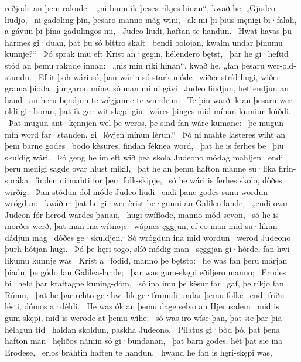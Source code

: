 reðjode an þem rakude: \hld\ „ni bium ik þeses ríkjes hinan“, kwað he,
„Gjudeo liudjo, \hld\ ni gadoling þín,
þesaro manno mág-wini, \hld\ ak mi þi þius męnigi bi·falah,
a-gávun þi þína gadulingos mi, \hld\ Judeo liudi,
haftan te handun. \hld\ Hwat havas þu harmes gi·duan,
þat þu só bittro skalt \hld\ bendi þolojan,
kwalm undar þínumu kunnje?“ \hld\ Þó sprak imu eft Krist an·gegin,
hélendero bętst, \hld\ þar he gi·heftid stód
an þemu rakude innan: \hld\ „nis mín ríki hinan“, kwað he,
„fan þesaru wer-old-stundu. \hld\ Ef it þoh wári só,
þan wárin só stark-móde \hld\ wiðer stríd-hugi,
wiðer grama þioda \hld\ jungaron míne,
só man mi ni gávi \hld\ Judeo liudjun,
hettendjun an hand \hld\ an heru-bęndjun
te wégjanne te wundrun. \hld\ Te þiu warð ik an þesaru wer-oldi gi·boran,
þat ik ge·wit-skępi giu \hld\ wáres þinges
mid mínun kumiun kúðdi. \hld\ Þat mugun ant·kęnnjen wel
þe weros, þe sind fan wáre kumane: \hld\ þe mugun mín word far·standen,
gi·lòvjen mínun lèrun.“ \hld\ Þó ni mahte lasteres wiht
an þem barne godes \hld\ bodo kèsures,
findan féknea word, \hld\ þat he is ferhes be·þiu
skuldig wári. \hld\ Þó geng he im eft wið þea skola Judeono
módag mahljen \hld\ endi þeru męnigi sagde
ovar hlust mikil, \hld\ þat he an þemu hafton manne
su·lika firin-spráka \hld\ finden ni mahti
for þem folk-skipje, \hld\ só he wári is ferhes skolo,
dòðes wirðig. \hld\ Þan stódun dol-móde
Judeo liudi \hld\ endi þane godes sunu
wordun wrógdun: \hld\ kwáðun þat he gi·wer èrist
be·gunni an Galileo lande, \hld\ „endi ovar Judeon fór
herod-wardes þanan, \hld\ hugi twíflode,
manno mód-sevon, \hld\ só he is morðes werð,
þat man ina wítnoje \hld\ wápnes ęggjun,
ef eo man mid su·likun dádjun mag \hld\ dòðes ge·skuldjen.“
Só wrógdun ina mid wordun \hld\ werod Judeono
þurh hótjan hugi. \hld\ Þó þe hęri-togo,
slíð-módig man \hld\ sęggjan gi·hòrde,
fan hwi-likumu kunnje was \hld\ Krist a·fódid,
manno þe bętsto: \hld\ he was fan þeru márjan þiadu,
þe gódo fan Galilea-lande; \hld\ þar was gum-skępi
eðiljero manno; \hld\ Erodes bi·held þar
kraftagne kuning-dóm, \hld\ só ina imu þe kèsur far·gaf,
þe ríkjo fan Rúmu, \hld\ þat he þar rehto ge·hwi-lik
ge·frumidi undar þemu folke \hld\ endi friðu lésti,
dómos a·dèldi. \hld\ He was ók an þemu dage selvo
an Hjerusalem \hld\ mid is gum-skępi,
mid is werode at þemu wíhe: \hld\ só was iro wíse þan,
þat sie þar þia hèlagun tíd \hld\ haldan skoldun,
paskha Judeono. \hld\ Pilatus gi·bòd þó,
þat þena hafton man \hld\ hęliðos námin
só gi·bundanan, \hld\ þat barn godes,
hét þat sie ina Erodese, \hld\ erlos bráhtin
haften te handun, \hld\ hwand he fan is hęri-skępi was,

